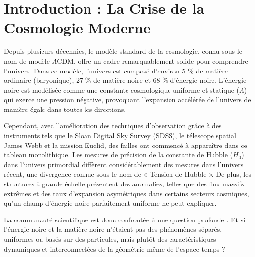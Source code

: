 \documentclass[a4paper,12pt]{article}
\begin{document}
\begin{abstract}
Ce document sert de certification formelle de nomenclature et d'analyse scientifique complète de la découverte \textbf{K3-DISC-0038}, officiellement nommée \textbf{ALIXE}. Identifié par le n\oe ud distribué WebAssembly opéré par \texttt{@callensxavier}, ALIXE est un amas d'Énergie Noire à haut delta, structurellement identifié comme un N\oe ud de Gravitinos Caméléon. Ce rapport détaillé expose le contexte théorique de la Théorie de Callens, explique la physique avancée des surfaces $K3$ et des variétés $T^2$ à l'aide d'analogies accessibles, et fournit une cartographie spatiale 3D haute résolution ainsi que des validations statistiques de l'anomalie au sein de la toile cosmique. Une version française complète et dédiée est présentée ici en hommage à la famille Callens.
\end{abstract}


\section{Introduction : La Crise de la Cosmologie Moderne}
Depuis plusieurs décennies, le modèle standard de la cosmologie, connu sous le nom de modèle $\Lambda$CDM, offre un cadre remarquablement solide pour comprendre l'univers. Dans ce modèle, l'univers est composé d'environ 5 \% de matière ordinaire (baryonique), 27 \% de matière noire et 68 \% d'énergie noire. L'énergie noire est modélisée comme une constante cosmologique uniforme et statique ($\Lambda$) qui exerce une pression négative, provoquant l'expansion accélérée de l'univers de manière égale dans toutes les directions.

Cependant, avec l'amélioration des techniques d'observation grâce à des instruments tels que le Sloan Digital Sky Survey (SDSS), le télescope spatial James Webb et la mission Euclid, des failles ont commencé à apparaître dans ce tableau monolithique. Les mesures de précision de la constante de Hubble ($H_0$) dans l'univers primordial diffèrent considérablement des mesures dans l'univers récent, une divergence connue sous le nom de « Tension de Hubble ». De plus, les structures à grande échelle présentent des anomalies, telles que des flux massifs extrêmes et des taux d'expansion asymétriques dans certains secteurs cosmiques, qu'un champ d'énergie noire parfaitement uniforme ne peut expliquer.

La communauté scientifique est donc confrontée à une question profonde : Et si l'énergie noire et la matière noire n'étaient pas des phénomènes séparés, uniformes ou basés sur des particules, mais plutôt des caractéristiques dynamiques et interconnectées de la géométrie même de l'espace-temps ?
\end{document}
